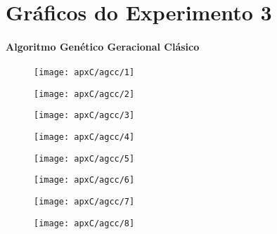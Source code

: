\chapter{Gráficos do Experimento 3}
\subsubsection{Algoritmo Genético Geracional Clásico}

\begin{figure}[H]
\centering

\texttt{[image: apxC/agcc/1]}

\end{figure}

\begin{figure}[H]
\centering

\texttt{[image: apxC/agcc/2]}

\end{figure}

\begin{figure}[H]
\centering

\texttt{[image: apxC/agcc/3]}

\end{figure}

\begin{figure}[H]
\centering

\texttt{[image: apxC/agcc/4]}

\end{figure}

\begin{figure}[H]
\centering

\texttt{[image: apxC/agcc/5]}

\end{figure}

\begin{figure}[H]
\centering

\texttt{[image: apxC/agcc/6]}

\end{figure}

\begin{figure}[H]
\centering

\texttt{[image: apxC/agcc/7]}

\end{figure}

\begin{figure}[H]
\centering

\texttt{[image: apxC/agcc/8]}

\end{figure}


